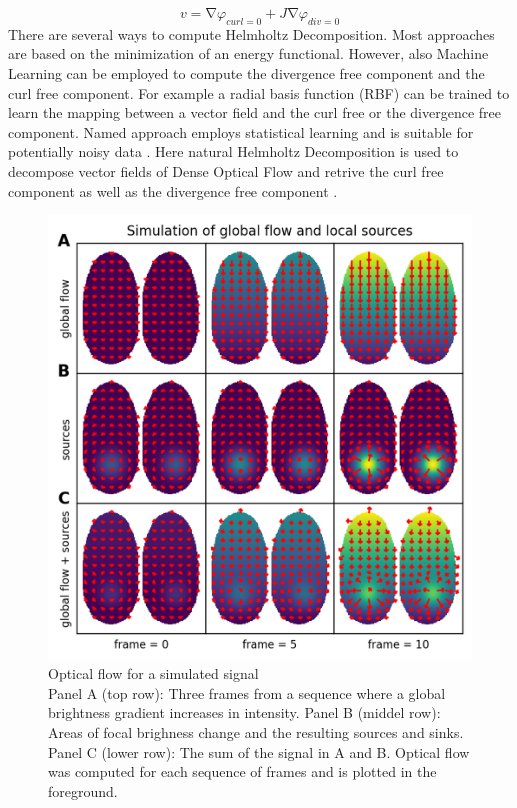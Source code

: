 \begin{equation}
  v=\mathrm{\nabla}\varphi_{curl=0}+J\mathrm{\nabla}\varphi_{div=0}
\label{eqn:helmholtz_decomposition}
\end{equation}
 There are several ways to compute Helmholtz Decomposition. Most approaches are based on the minimization of an energy functional. However, also Machine Learning can be employed to compute the divergence free component and the curl free component. For example a radial basis function (RBF) can be trained to learn the mapping between a vector field and the curl free or the divergence free component. Named approach employs statistical learning and is suitable for potentially noisy data \parencite{bhatia2012helmholtz}. Here natural Helmholtz Decomposition is used to decompose vector fields of Dense Optical Flow and retrive the curl free component as well as the divergence free component \parencite{bhatia2014natural}. \\
\begin{figure}[!htb]
\centering
\includegraphics[width=\textwidth,height=\textheight,keepaspectratio]{Figures/optical_flow_for_a_simulated_signal}
\decoRule
\caption[Optical flow for a simulated signal]{Optical flow for a simulated signal\\ Panel A (top row): Three frames from a sequence where a global brightness gradient increases in intensity. Panel B (middel row): Areas of focal brighness change and the resulting sources and sinks. Panel C (lower row): The sum of the signal in A and B. Optical flow was computed for each sequence of frames and is plotted in the foreground.}
\label{fig:optical_flow_for_a_simulated_signal}
\end{figure}
